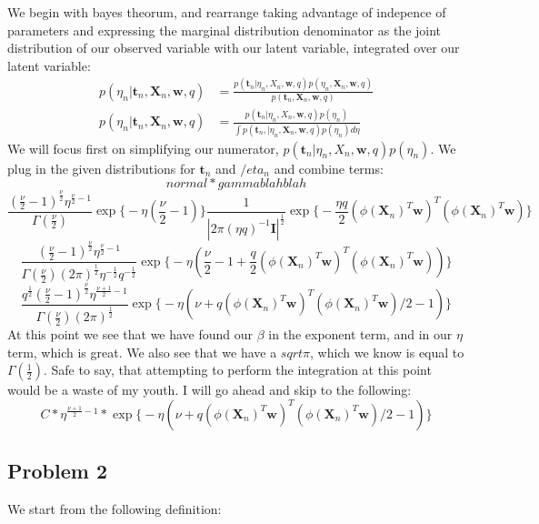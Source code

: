 \documentclass[a4paper,12pt]{article}
\begin{document}
We begin with bayes theorum, and rearrange taking advantage of indepence of parameters and expressing the marginal distribution denominator as the joint distribution of our observed variable with our latent variable, integrated over our latent variable:
%
\begin{align*}
p(\eta_n | \bm{t}_n, \bm{X}_n, \bm{w}, q) &= \frac{ p(\bm{t}_n | \eta_n, X_n, \bm{w}, q) p(\eta_n, \bm{X}_n, \bm{w}, q)  }{ p(\bm{t}_n, \bm{X}_n, \bm{w}, q )} \\
p(\eta_n | \bm{t}_n, \bm{X}_n, \bm{w}, q) &= \frac{ p(\bm{t}_n | \eta_n, X_n, \bm{w}, q) p(\eta_n)  }{ \int p(\bm{t}_n, | \eta_n, \bm{X}_n, \bm{w}, q )p(\eta_n) d\eta }
\end{align*}
%
We will focus first on simplifying our numerator, $p(\bm{t}_n | \eta_n, X_n, \bm{w}, q) p(\eta_n)$. We plug in the given distributions for $\bm{t}_n$ and $/eta_n$ and combine terms:
$$
normal * gamma blah blah
$$
%
$$
\frac{ (\frac{\nu}{2} - 1)^{\frac{\nu}{2}} \eta^{\frac{\nu}{2} - 1} }{ \Gamma(\frac{\nu}{2}) }
\exp \Bigg\{  -\eta(\frac{\nu}{2} - 1)   \Bigg\}
\frac{1}{| 2\pi(\eta q)^{-1} \bm{I} |^{ \frac{1}{2}}}
\exp \Bigg\{  -\frac{\eta q}{2} (\phi(\bm{X}_n)^{T}\bm{w})^T(\phi(\bm{X}_n)^T\bm{w})   \Bigg\}
$$
$$
\frac{ (\frac{\nu}{2} - 1)^{\frac{\nu}{2}} \eta^{\frac{\nu}{2} - 1} }{ \Gamma(\frac{\nu}{2}) (2\pi)^{ \frac{1}{2}} \eta^{- \frac{1}{2}} q^{- \frac{1}{2} } }
\exp \Bigg\{ -\eta(\frac{\nu}{2} - 1 + \frac{q}{2} (\phi(\bm{X}_n)^{T}\bm{w})^T(\phi(\bm{X}_n)^T\bm{w}))   \Bigg\}
$$
$$
\frac{ q^{ \frac{1}{2}} (\frac{\nu}{2} - 1)^{\frac{\nu}{2}} \eta^{\frac{\nu + 1}{2} - 1} } { \Gamma(\frac{\nu}{2}) (2\pi)^{ \frac{1}{2}} }
\exp \Bigg\{ -\eta(\nu + q (\phi(\bm{X}_n)^{T}\bm{w})^T(\phi(\bm{X}_n)^T\bm{w})/2 - 1)   \Bigg\}
$$
%
At this point we see that we have found our $\beta$ in the exponent term, and in our $\eta$ term, which is great. We also see that we have a $sqrt{\pi}$, which we know is equal to $\Gamma(\frac{1}{2})$. Safe to say, that attempting to perform the integration at this point would be a waste of my youth. I will go ahead and skip to the following:
%
$$
C * \eta^{\frac{\nu + 1}{2} - 1} *
\exp \Bigg\{ -\eta(\nu + q (\phi(\bm{X}_n)^{T}\bm{w})^T(\phi(\bm{X}_n)^T\bm{w})/2 - 1)   \Bigg\}
$$

\subsection*{Problem 2}

We start from the following definition:
\end{document}
